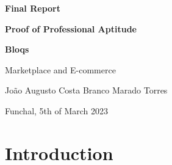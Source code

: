 \documentclass[a4paper,11pt]{report}
\begin{document}
\fontsize{11pt}{13.6pt}\selectfont

\begin{titlepage}
  \centering





  \textbf{\Huge Final Report}

  \textbf{\huge Proof of Professional Aptitude}


  \textbf{\huge Bloqs}

  \large{Marketplace and E-commerce}

  João Augusto Costa Branco Marado Torres

  Funchal, 5th of March 2023
\end{titlepage}

\tableofcontents

\section{Introduction}

\end{document}
